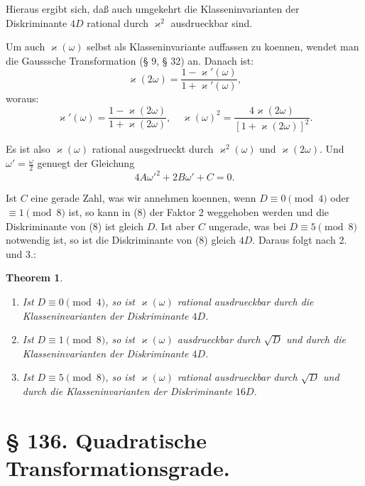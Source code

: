 \documentclass[12pt,a4paper]{article}
\theoremstyle{plain}
\newtheorem{theorem}{Theorem}[section]
\theoremstyle{definition}
\theoremstyle{remark}
\begin{document}
Hieraus ergibt sich, da\ss{} auch umgekehrt die Klasseninvarianten der Diskriminante $4D$ rational durch $\varkappa^2$ ausdrueckbar sind.

Um auch $\varkappa(\omega)$ selbst als Klasseninvariante auffassen zu koennen, wendet man die Gausssche Transformation (\S{} 9, \S{} 32) an. Danach ist:
\begin{equation}\label{eq:135_9}
\varkappa(2\omega) = \frac{1 - \varkappa'(\omega)}{1 + \varkappa'(\omega)},
\end{equation}
woraus:
\[
\varkappa'(\omega) = \frac{1 - \varkappa(2\omega)}{1 + \varkappa(2\omega)}, \quad \varkappa(\omega)^2 = \frac{4\varkappa(2\omega)}{[1 + \varkappa(2\omega)]^2}.
\]

Es ist also $\varkappa(\omega)$ rational ausgedrueckt durch $\varkappa^2(\omega)$ und $\varkappa(2\omega)$. Und $\omega' = \frac{\omega}{2}$ genuegt der Gleichung
\begin{equation}\label{eq:135_10}
4A\omega'^2 + 2B\omega' + C = 0.
\end{equation}

Ist $C$ eine gerade Zahl, was wir annehmen koennen, wenn $D \equiv 0 \pmod{4}$ oder $\equiv 1 \pmod{8}$ ist, so kann in (8) der Faktor 2 weggehoben werden und die Diskriminante von (8) ist gleich $D$. Ist aber $C$ ungerade, was bei $D \equiv 5 \pmod{8}$ notwendig ist, so ist die Diskriminante von (8) gleich $4D$. Daraus folgt nach 2. und 3.:

\begin{theorem}
\begin{enumerate}
\item[a)] Ist $D \equiv 0 \pmod{4}$, so ist $\varkappa(\omega)$ rational ausdrueckbar durch die Klasseninvarianten der Diskriminante $4D$.
\item[b)] Ist $D \equiv 1 \pmod{8}$, so ist $\varkappa(\omega)$ ausdrueckbar durch $\sqrt{D}$ und durch die Klasseninvarianten der Diskriminante $4D$.
\item[c)] Ist $D \equiv 5 \pmod{8}$, so ist $\varkappa(\omega)$ rational ausdrueckbar durch $\sqrt{D}$ und durch die Klasseninvarianten der Diskriminante $16D$.
\end{enumerate}
\end{theorem}

\newpage

\section*{\S{} 136. Quadratische Transformationsgrade.}
\end{document}
